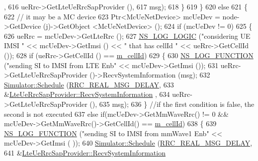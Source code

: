 \begin{DoxyCode}
      ,
616                                    ueRrc->GetLteUeRrcSapProvider (), 
617                                    msg);          
618             \}             
619           \}
620           \textcolor{keywordflow}{else}
621           \{
622             \textcolor{comment}{// it may be a MC device}
623             Ptr<McUeNetDevice> mcUeDev = node->GetDevice (j)->GetObject <McUeNetDevice> ();
624             \textcolor{keywordflow}{if} (mcUeDev != 0)
625             \{
626               ueRrc = mcUeDev->GetLteRrc ();              
627               \hyperlink{group__logging_ga88acd260151caf2db9c0fc84997f45ce}{NS\_LOG\_LOGIC} (\textcolor{stringliteral}{"considering UE IMSI "} << mcUeDev->GetImsi () << \textcolor{stringliteral}{" that has cellId 
      "} << ueRrc->GetCellId ());
628               \textcolor{keywordflow}{if} (ueRrc->GetCellId () == \hyperlink{classns3_1_1MmWaveLteEnbRrcProtocolReal_af21fba3734d1818dc9166e6ab8817b66}{m\_cellId})
629               \{       
630                 \hyperlink{log-macros-disabled_8h_a90b90d5bad1f39cb1b64923ea94c0761}{NS\_LOG\_FUNCTION} (\textcolor{stringliteral}{"sending SI to IMSI from LTE Enb"} << mcUeDev->GetImsi ());
631                 ueRrc->GetLteUeRrcSapProvider ()->RecvSystemInformation (msg);
632                 \hyperlink{classns3_1_1Simulator_a671882c894a08af4a5e91181bf1eec13}{Simulator::Schedule} (\hyperlink{namespacens3_a8e3f859197e39602ba3ea59033f00404}{RRC\_REAL\_MSG\_DELAY}, 
633                                      &\hyperlink{classns3_1_1LteUeRrcSapProvider_a34d16c5adabf7ee0caf111fd2b6bfbd3}{LteUeRrcSapProvider::RecvSystemInformation}
      ,
634                                      ueRrc->GetLteUeRrcSapProvider (), 
635                                      msg);          
636               \}   \textcolor{comment}{//if the first condition is false, the second is not executed}
637               \textcolor{keywordflow}{else} \textcolor{keywordflow}{if}(mcUeDev->GetMmWaveRrc() != 0 && mcUeDev->GetMmWaveRrc()->GetCellId() == 
      \hyperlink{classns3_1_1MmWaveLteEnbRrcProtocolReal_af21fba3734d1818dc9166e6ab8817b66}{m\_cellId})
638               \{
639                 \hyperlink{log-macros-disabled_8h_a90b90d5bad1f39cb1b64923ea94c0761}{NS\_LOG\_FUNCTION} (\textcolor{stringliteral}{"sending SI to IMSI from mmWave1 Enb"} << mcUeDev->GetImsi (
      ));
640                 \hyperlink{classns3_1_1Simulator_a671882c894a08af4a5e91181bf1eec13}{Simulator::Schedule} (\hyperlink{namespacens3_a8e3f859197e39602ba3ea59033f00404}{RRC\_REAL\_MSG\_DELAY}, 
641                                      &\hyperlink{classns3_1_1LteUeRrcSapProvider_a34d16c5adabf7ee0caf111fd2b6bfbd3}{LteUeRrcSapProvider::RecvSystemInformation}

\end{DoxyCode}
